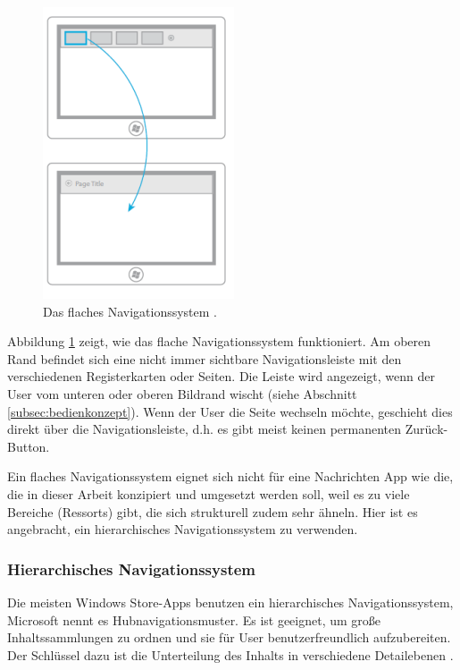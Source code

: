 \documentclass[12pt,a4paper,bibtotoc,abstracton]{scrartcl}
\begin{document}
\begin{figure}[h]	
	\centering
	\includegraphics[scale=1]{Bilder/Abbildungen/ms_navigation_flach.png} 
	\caption[Das flache Navigationssystem]{Das flaches Navigationssystem \protect\citep{MicrosoftNavidesign2013}.}
	\label{fig:naviflach}
\end{figure}

Abbildung \ref{fig:naviflach} zeigt, wie das flache Navigationssystem funktioniert. Am oberen Rand befindet sich eine nicht immer sichtbare Navigationsleiste mit den verschiedenen Registerkarten oder Seiten. Die Leiste wird angezeigt, wenn der User vom unteren oder oberen Bildrand wischt (siehe Abschnitt \ref{subsec:bedienkonzept}). Wenn der User die Seite wechseln möchte, geschieht dies  direkt über die Navigationsleiste, d.h. es gibt meist keinen permanenten Zurück-Button. 

Ein flaches Navigationssystem eignet sich nicht für eine Nachrichten App wie die, die in dieser Arbeit konzipiert und umgesetzt werden soll, weil es zu viele Bereiche (Ressorts) gibt, die sich strukturell zudem sehr ähneln. Hier ist es angebracht, ein hierarchisches Navigationssystem zu verwenden.    


\subsubsection{Hierarchisches Navigationssystem}
\label{subsubsec:hierachischessystem}
Die meisten Windows Store-Apps benutzen ein hierarchisches Navigationssystem, Microsoft nennt es Hubnavigationsmuster. Es ist geeignet, um große Inhaltssammlungen zu ordnen und sie für User benutzerfreundlich aufzubereiten. Der Schlüssel dazu ist die Unterteilung des Inhalts in verschiedene Detailebenen \citep{MicrosoftNavidesign2013}.
\end{document}

